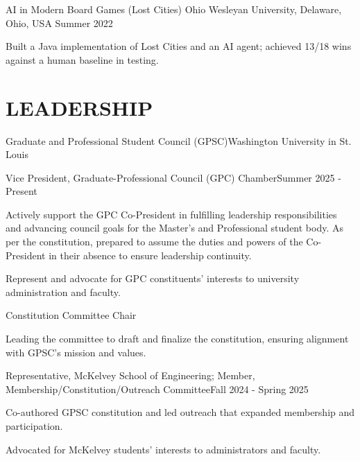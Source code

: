 \documentclass[10pt, letterpaper]{article}
\begin{document}
\vspace{\entrySpacing}
\begin{experienceentry}
  {AI in Modern Board Games (Lost Cities)} %
  {Ohio Wesleyan University, Delaware, Ohio, USA} %
  {Summer 2022} %
  \item Built a Java implementation of Lost Cities and an AI agent; achieved 13/18 wins against a human baseline in testing.
\end{experienceentry}

\vspace{\headerSpacing}

\section{LEADERSHIP}

\vspace{\entrySpacing}
\begin{leadershipentry}{Graduate and Professional Student Council (GPSC)}{Washington University in St. Louis}
  \begin{positionentry}{Vice President, Graduate-Professional Council (GPC) Chamber}{Summer 2025 - Present}
    \item Actively support the GPC Co-President in fulfilling leadership responsibilities and advancing council goals for the Master's and Professional student body. As per the constitution, prepared to assume the duties and powers of the Co-President in their absence to ensure leadership continuity.
    \item Represent and advocate for GPC constituents' interests to university administration and faculty.
  \end{positionentry}
  \begin{positionentry}{Constitution Committee Chair}{}
    \item Leading the committee to draft and finalize the constitution, ensuring alignment with GPSC's mission and values.
  \end{positionentry}
  \begin{positionentry}{Representative, McKelvey School of Engineering; Member, Membership/Constitution/Outreach Committee}{Fall 2024 - Spring 2025}
    \item Co-authored GPSC constitution and led outreach that expanded membership and participation.
    \item Advocated for McKelvey students' interests to administrators and faculty.
  \end{positionentry}
\end{leadershipentry}
\end{document}
